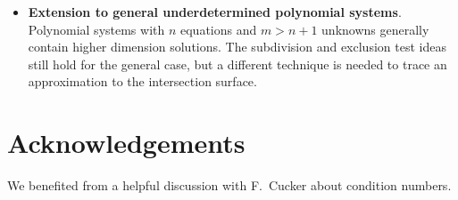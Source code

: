 \documentclass{article}
\begin{document}
\begin{itemize}
\item \textbf{Extension to general underdetermined polynomial systems}.  Polynomial systems with $n$ equations and $m > n+1$ unknowns generally contain higher dimension solutions.  The subdivision and exclusion test ideas still hold for the general case, but a different technique is needed to trace an approximation to the intersection surface. 


\end{itemize}

\section{Acknowledgements}
We benefited from a helpful discussion with F.~Cucker about
condition numbers.


\end{document}
